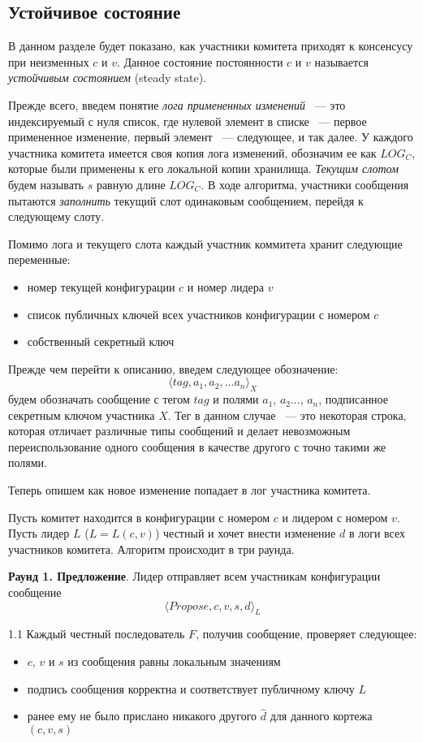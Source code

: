 \subsection{Устойчивое состояние}
В данном разделе будет показано, как участники комитета приходят к консенсусу при неизменных $c$ и $v$. Данное состояние постоянности $c$ и $v$ называется \textit{устойчивым состоянием} (steady state).

Прежде всего, введем понятие \textit{лога примененных изменений} ~--- это индексируемый с нуля список, где нулевой элемент в списке ~--- первое примененное изменение, первый элемент ~--- следующее, и так далее. У каждого участника комитета имеется своя копия лога изменений, обозначим ее как $LOG_C$, которые были применены к его локальной копии хранилища. \textit{Текущим слотом} будем называть $s$ равную длине $LOG_C$. 
В ходе алгоритма, участники сообщения пытаются \textit{заполнить} текущий слот одинаковым сообщением, перейдя к следующему слоту.

Помимо лога и текущего слота каждый участник коммитета хранит следующие переменные:
\begin{itemize}
\item номер текущей конфигурации $c$ и номер лидера $v$
\item список публичных ключей всех участников конфигурации с номером $c$ 
\item собственный секретный ключ
\end{itemize}

Прежде чем перейти к описанию, введем следующее обозначение:
\[ \langle tag, a_1, a_2, ... a_n \rangle_X \] будем обозначать сообщение с тегом $tag$ и полями $a_1$, $a_2$..., $a_n$, подписанное секретным ключом участника $X$. Тег в данном случае ~--- это некоторая строка, которая отличает различные типы сообщений и делает невозможным переиспользование одного сообщения в качестве другого с точно такими же полями.

Теперь опишем как новое изменение попадает в лог участника комитета.

Пусть комитет находится в конфигурации с номером $c$ и лидером с номером $v$. 
Пусть лидер $L$ ($L = L(c, v)$) честный и хочет внести изменение $d$ в логи всех участников комитета. Алгоритм происходит в три раунда.

\textbf{Раунд 1. Предложение}. Лидер отправляет всем участникам конфигурации сообщение 
\[ \langle Propose, c, v, s, d \rangle_L \]

1.1 Каждый честный последователь $F$, получив сообщение, проверяет следующее:
\begin{itemize}
\item $c$, $v$ и $s$ из сообщения равны локальным значениям
\item подпись сообщения корректна и соответствует публичному ключу $L$
\item ранее ему не было прислано никакого другого $\hat d$ для данного кортежа $(c, v, s)$
\end{itemize}

